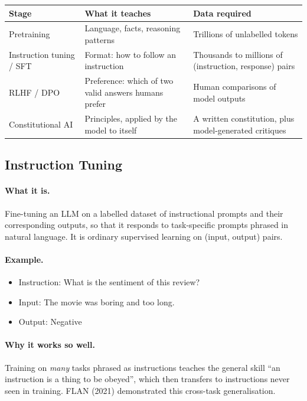 \documentclass[11pt,a4paper]{article}
\begin{document}
\begin{center}
\begin{tabularx}{\textwidth}{lYY}
\textbf{Stage} & \textbf{What it teaches} & \textbf{Data required} \\
\hline
Pretraining & Language, facts, reasoning patterns & Trillions of unlabelled tokens \\
Instruction tuning / SFT & Format: how to follow an instruction & Thousands to millions of
(instruction, response) pairs \\
RLHF / DPO & Preference: which of two valid answers humans prefer & Human comparisons of
model outputs \\
Constitutional AI & Principles, applied by the model to itself & A written constitution, plus
model-generated critiques \\
\end{tabularx}
\end{center}

\subsection{Instruction Tuning}

\paragraph{What it is.} Fine-tuning an LLM on a labelled dataset of instructional prompts and
their corresponding outputs, so that it responds to task-specific prompts phrased in natural
language. It is ordinary supervised learning on (input, output) pairs.

\paragraph{Example.}
\begin{itemize}
\item Instruction: What is the sentiment of this review?
\item Input: The movie was boring and too long.
\item Output: Negative
\end{itemize}

\paragraph{Why it works so well.} Training on \emph{many} tasks phrased as instructions
teaches the general skill ``an instruction is a thing to be obeyed'', which then transfers to
instructions never seen in training. FLAN (2021) demonstrated this cross-task generalisation.
\end{document}
